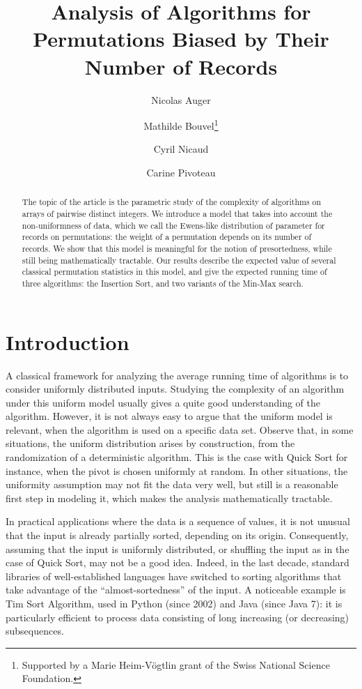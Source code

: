 \documentclass[proceedings]{aofa}
\author{Nicolas Auger\addressmark{1}
  \and Mathilde Bouvel\addressmark{2}\thanks{Supported by a Marie Heim-Vögtlin grant of the Swiss National Science Foundation.}
  \and Cyril Nicaud\addressmark{1}
  \and Carine Pivoteau\addressmark{1}}
\title[Analysis of Algorithms for Biased Permutations]{Analysis of Algorithms for Permutations Biased by Their Number of Records}
\begin{document}
\maketitle
\begin{abstract}
The topic of the article is the parametric study of the complexity of algorithms on arrays of pairwise distinct integers. 
We introduce a model that takes into account the non-uniformness of data, 
which we call the Ewens-like distribution of parameter  for records on permutations: 
the weight  of a permutation depends on its number  of records. 
We show that this model is  meaningful for the notion of presortedness, while still being mathematically tractable.
Our results describe the expected value of several classical permutation statistics in this model, 
and give the expected running time of three algorithms: the Insertion Sort, and two variants of the Min-Max search. 
\end{abstract}




\section{Introduction}\label{sec:intro}
A classical framework for analyzing the average running time of algorithms is to consider uniformly distributed inputs. 
Studying the complexity of an algorithm under this uniform model usually gives a quite good understanding of the algorithm. 
However, it is not always easy to argue that the uniform model is relevant, when the algorithm is used on a specific data set. 
Observe that, in some situations, the uniform distribution arises by construction, from the  randomization of a deterministic algorithm. 
This is the case with Quick Sort for instance, when the pivot is chosen uniformly at random.
In other situations, the uniformity assumption may not fit the data very well, 
but still is a reasonable first step in modeling it, which  makes the analysis mathematically tractable.

In practical applications where the data is a sequence of values, 
it is not unusual that the input is already partially sorted, depending on its origin. 
Consequently, assuming that the input is uniformly distributed, or shuffling the input as in the case of Quick Sort, may not be a good idea.  
Indeed, in the last decade, standard libraries of well-established languages have switched to sorting algorithms that take advantage of the ``almost-sortedness'' of the input. 
A noticeable example is Tim Sort Algorithm, used in Python (since 2002) and Java (since Java 7): it is particularly efficient to process data consisting of long increasing (or decreasing) subsequences.
\end{document}
